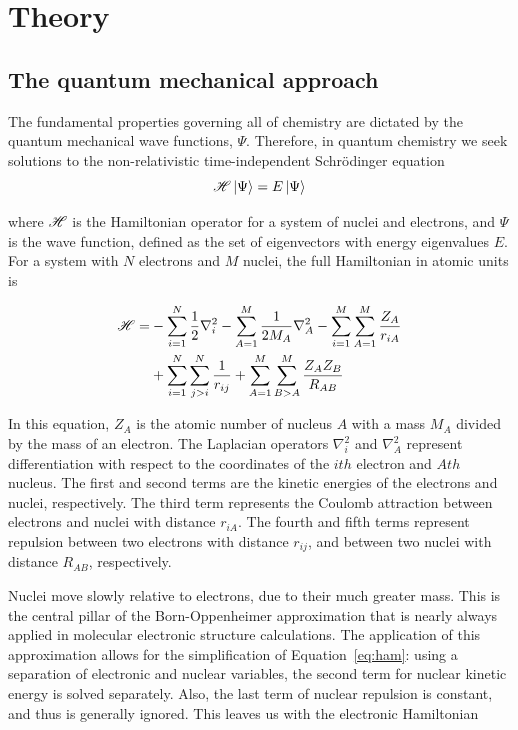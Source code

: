 
\chapter{Theory}
\label{ch:theory}

\begin{doublespace}
\section{The quantum mechanical approach}

The fundamental properties governing all of chemistry are dictated by the
quantum mechanical wave functions, $\Psi$. Therefore, in quantum chemistry we
seek solutions to the non-relativistic time-independent Schr{\"o}dinger
equation \begin{equation}
\mathscr{H} \ket{\Psi} = E \ket{\Psi}
\label{eq:schrodinger}
\end{equation}

\noindent where $\mathscr{H}$ is the Hamiltonian operator for a system of nuclei and
electrons, and $\Psi$ is the wave function, defined as the set of eigenvectors
with energy eigenvalues $E$.\cite{Griffiths2016} For a system with $N$
electrons and $M$ nuclei, the full Hamiltonian in atomic units is

\begin{equation}
\begin{split}
\mathscr{H} = &-\sum_{i=1}^N \frac{1}{2}\nabla_i^2 - \sum_{A=1}^M\frac{1}{2M_A}\nabla_A^2
-\sum_{i=1}^M\sum_{A=1}^M\frac{Z_A}{r_{iA}} \\
&+ \sum_{i=1}^N\sum_{j>i}^N \frac{1}{r_{ij}} + \sum_{A=1}^M\sum_{B>A}^M
\frac{Z_A Z_B}{R_{AB}}
\label{eq:ham}
\end{split}
\end{equation}

\noindent In this equation, $Z_A$ is the atomic number of nucleus $A$ with a
mass $M_A$ divided by the mass of an electron. The Laplacian operators
$\nabla_i^2$ and $\nabla_A^2$ represent differentiation with respect to the
coordinates of the $ith$ electron and $Ath$ nucleus. The first and second terms
are the kinetic energies of the electrons and nuclei, respectively. The third
term represents the Coulomb attraction between electrons and nuclei with
distance $r_{iA}$. The fourth and fifth terms represent repulsion between two
electrons with distance $r_{ij}$, and between two nuclei with distance
$R_{AB}$, respectively.

Nuclei move slowly relative to electrons, due to their much greater mass. This
is the central pillar of the Born-Oppenheimer approximation that is nearly
always applied in molecular electronic structure calculations. The application
of this approximation allows for the simplification of Equation~\ref{eq:ham}:
using a separation of electronic and nuclear variables, the second term for
nuclear kinetic energy is solved separately. Also, the last term of nuclear
repulsion is constant, and thus is generally ignored. This leaves us with the
electronic Hamiltonian


\end{doublespace}
